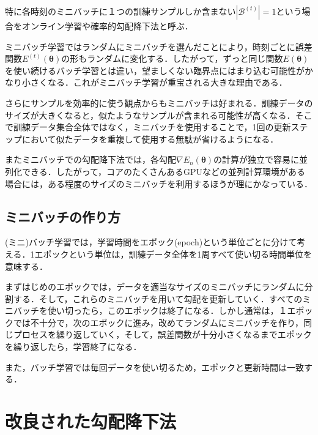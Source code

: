 \documentclass[a4paper,11pt]{jsreport}
\begin{document}
特に各時刻のミニバッチに１つの訓練サンプルしか含まない$|\mathcal{B}^{(t)}|=1$という場合をオンライン学習や確率的勾配降下法と呼ぶ．\par
ミニバッチ学習ではランダムにミニバッチを選んだことにより，時刻ごとに誤差関数$E^{(t)}(\bm{\theta})$の形もランダムに変化する．したがって，ずっと同じ関数$E(\bm{\theta})$を使い続けるバッチ学習とは違い，望ましくない臨界点にはまり込む可能性がかなり小さくなる．これがミニバッチ学習が重宝される大きな理由である．\par
さらにサンプルを効率的に使う観点からもミニバッチは好まれる．訓練データのサイズが大きくなると，似たようなサンプルが含まれる可能性が高くなる．そこで訓練データ集合全体ではなく，ミニバッチを使用することで，1回の更新ステップにおいて似たデータを重複して使用する無駄が省けるようになる．\par
またミニバッチでの勾配降下法では，各勾配$\nabla E_n(\bm{\theta})$の計算が独立で容易に並列化できる．したがって，コアのたくさんあるGPUなどの並列計算環境がある場合には，ある程度のサイズのミニバッチを利用するほうが理にかなっている．

\subsection{ミニバッチの作り方}
(ミニ)バッチ学習では，学習時間をエポック(epoch)という単位ごとに分けて考える．1エポックという単位は，訓練データ全体を1周すべて使い切る時間単位を意味する．\par
まずはじめのエポックでは，データを適当なサイズのミニバッチにランダムに分割する．そして，これらのミニバッチを用いて勾配を更新していく．すべてのミニバッチを使い切ったら，このエポックは終了になる．しかし通常は，１エポックでは不十分で，次のエポックに進み，改めてランダムにミニバッチを作り，同じプロセスを繰り返していく，そして，誤差関数が十分小さくなるまでエポックを繰り返したら，学習終了になる．\par
また，バッチ学習では毎回データを使い切るため，エポックと更新時間は一致する．

\section{改良された勾配降下法}
\end{document}
